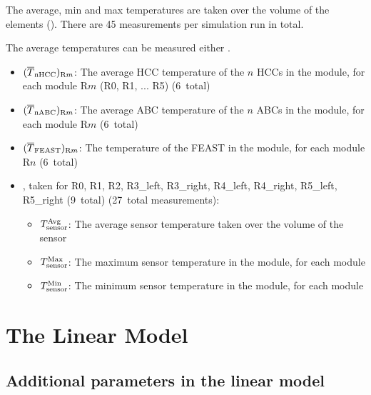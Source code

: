 
The average, min and max temperatures are taken over the volume of the elements ().
There are 45 measurements per simulation run in total.

The average temperatures can be measured either .

\begin{itemize}
\item $(\overline{T}_\text{nHCC})_{{\text{R}m}}$: The average HCC temperature of the $n$ HCCs in the module, for each module R$m$ (R0, R1, ... R5) (6~total)
\item $(\overline{T}_\text{nABC})_{{\text{R}m}}$: The average ABC temperature of the $n$ ABCs in the module, for each module R$m$ (6~total)
\item $(\overline{T}_\text{FEAST})_{{\text{R}m}}$: The temperature of the FEAST in the module, for each module R$n$ (6~total)
\item \tsensor, taken for R0, R1, R2, R3\_left, R3\_right, R4\_left, R4\_right, R5\_left, R5\_right (9~total) (27~total measurements):
\begin{itemize}
  \item $T_\text{sensor}^\text{Avg}$: The average sensor temperature taken over the volume of the sensor
  \item $T_\text{sensor}^\text{Max}$: The maximum sensor temperature in the module, for each module
  \item $T_\text{sensor}^\text{Min}$: The minimum sensor temperature in the module, for each module
\end{itemize}
\end{itemize}




\section{The Linear Model}

\subsection{Additional parameters in the linear model}

